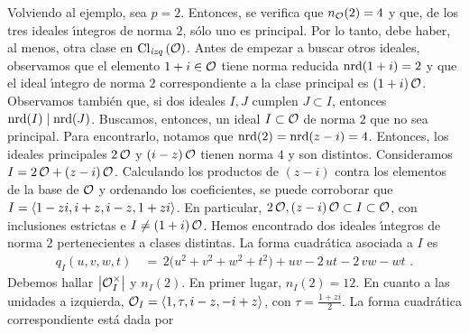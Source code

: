 Volviendo al ejemplo, sea $p=2$. Entonces, se verifica que $n_{\cal{O}}(2)=4$
y que, de los tres ideales \'{\i}ntegros de norma $2$, s\'{o}lo uno es
principal. Por lo tanto, debe haber, al menos, otra clase en
$\lClass{\cal{O}}$. Antes de empezar a buscar otros ideales, observamos que el
elemento $1+i\in\cal{O}$ tiene norma reducida $\nrd(1+i)=2$ y que el ideal
\'{\i}ntegro de norma $2$ correspondiente a la clase principal es
$(1+i)\,\cal{O}$. Observamos tambi\'{e}n que, si dos ideales $I,J$ cumplen
$J\subset I$, entonces $\nrd(I)\mid\nrd(J)$. Buscamos, entonces, un ideal
$I\subset\cal{O}$ de norma $2$ que no sea principal. Para encontrarlo, notamos
que $\nrd(2)=\nrd(z-i)=4$. Entonces, los ideales principales $2\,\cal{O}$ y
$(i-z)\,\cal{O}$ tienen norma $4$ y son distintos. Consideramos
$I=2\,\cal{O}+(z-i)\,\cal{O}$. Calculando los productos de $(z-i)$ contra los
elementos de la base de $\cal{O}$ y ordenando los coeficientes, se puede
corroborar que $I=\generado{1-zi,i+z,i-z,1+zi}$. En particular,
$2\,\cal{O},(z-i)\,\cal{O}\subset I\subset\cal{O}$, con inclusiones estrictas e
$I\not=(1+i)\,\cal{O}$. Hemos encontrado dos ideales \'{\i}ntegros de norma $2$
pertenecientes a clases distintas. La forma cuadr\'{a}tica asociada a $I$ es
\begin{align*}
	q_{I}(u,v,w,t) %
	& \,=\,2\big(u^{2}+v^{2}+w^{2}+t^{2}\big)+uv-2\,ut-2\,vw-wt
	\text{ .}
\end{align*}
%
Debemos hallar $\big|\cal{O}_{I}^{\times}\big|$ y $n_{I}(2)$. En primer lugar,
$n_{I}(2)=12$. En cuanto a las unidades a izquierda,
$\cal{O}_{I}=\generado{1,\tau,i-z,-i+z}$,
con $\tau = \frac{1+zi}{2}$.
La forma cuadr\'{a}tica correspondiente est\'{a} dada por
